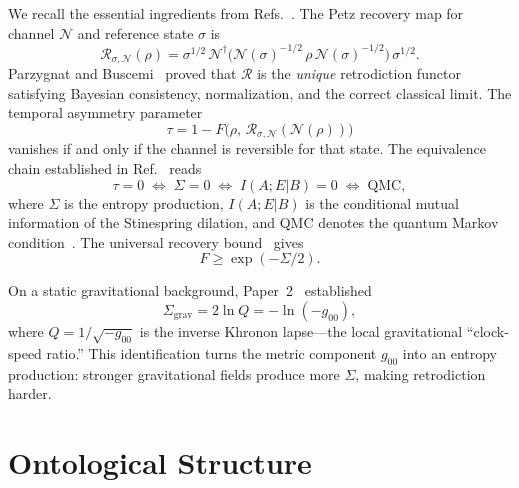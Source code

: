 \documentclass[prl,twocolumn,superscriptaddress,longbibliography,floatfix]{revtex4-2}
\newcommand{\Petz}{\mathcal{R}}
\newcommand{\chan}{\mathcal{N}}
\newcommand{\tauasym}{\tau}
\newcommand{\Sgrav}{\Sigma_{\mathrm{grav}}}
\begin{document}
We recall the essential ingredients from Refs.~\cite{Paper1,Paper2}.
The Petz recovery map for channel $\chan$ and reference state $\sigma$
is~\cite{Petz1986}
\begin{equation}
\Petz_{\sigma,\chan}(\rho) = \sigma^{1/2}\,
\chan^\dagger\!\big(\chan(\sigma)^{-1/2}\,\rho\,
\chan(\sigma)^{-1/2}\big)\,\sigma^{1/2}.
\label{eq:petz}
\end{equation}
Parzygnat and Buscemi~\cite{Parzygnat2023} proved that $\Petz$ is
the \emph{unique} retrodiction functor satisfying Bayesian
consistency, normalization, and the correct classical limit.  The
temporal asymmetry parameter
\begin{equation}
\tauasym = 1 - F\!\big(\rho,\,\Petz_{\sigma,\chan}(\chan(\rho))\big)
\label{eq:tau}
\end{equation}
vanishes if and only if the channel is reversible for that state.  The
equivalence chain established in Ref.~\cite{Paper1} reads
\begin{equation}
\tauasym = 0 \;\Longleftrightarrow\; \Sigma = 0
\;\Longleftrightarrow\; I(A;E|B) = 0
\;\Longleftrightarrow\; \text{QMC},
\label{eq:equiv}
\end{equation}
where $\Sigma$ is the entropy production, $I(A;E|B)$ is the
conditional mutual information of the Stinespring dilation, and QMC
denotes the quantum Markov condition~\cite{Fawzi2015}.  The universal
recovery bound~\cite{Junge2018} gives
\begin{equation}
F \geq \exp(-\Sigma/2).
\label{eq:F_bound}
\end{equation}

On a static gravitational background, Paper~2~\cite{Paper2}
established
\begin{equation}
\Sgrav = 2\ln Q = -\ln(-g_{00}),
\label{eq:Sigma_grav}
\end{equation}
where $Q = 1/\sqrt{-g_{00}}$ is the inverse Khronon lapse---the
local gravitational ``clock-speed ratio.''  This identification turns
the metric component $g_{00}$ into an entropy production: stronger
gravitational fields produce more $\Sigma$, making retrodiction
harder.

\section{Ontological Structure}
\label{sec:ontology}
\end{document}
